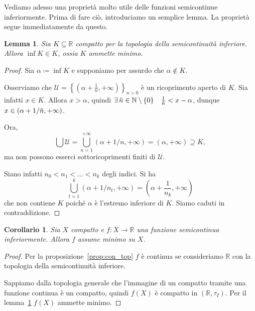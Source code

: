 \documentclass[a4paper, 11pt]{article}
\newcommand{\R}{\mathbb{R}}
\theoremstyle{plain} 	%
\newtheorem{lemma}{Lemma}
\newtheorem{corollario}{Corollario}
\theoremstyle{definition}
\theoremstyle{remark}
\begin{document}
    Vediamo adesso una proprietà molto utile delle funzioni semicontinue inferiormente. Prima di fare ciò, introduciamo un semplice lemma. La proprietà segue immediatamente da questo.
    \begin{lemma}\label{lemma:cpt_inf}
        Sia $K\subseteq\R$ compatto per la topologia della semicontinuità inferiore. Allora $\inf K\in K$, ossia $K$ ammette minimo.        
    \end{lemma}
    \begin{proof}
        Sia $\alpha\coloneqq\inf K$ e supponiamo per assurdo che $\alpha\notin K$. 

        Osserviamo che $\mathcal{U}=\left\{\left(\alpha+\frac{1}{n},+\infty\right)\right\}_{n>0}$ è un ricoprimento aperto di $K$. Sia infatti $x\in K$. Allora $x>\alpha$, quindi $\exists\,\Tilde{n}\in\mathbb{N}\setminus\{0\}\quad \frac{1}{\Tilde{n}}<x-\alpha$, dunque $x\in\left(\alpha+1/\Tilde{n},+\infty\right)$.

        Ora, 
        \[
            \bigcup\mathcal{U}=\bigcup_{n=1}^{+\infty}(\alpha+1/n,+\infty)=\left(\alpha,+\infty\right)\supseteq K,
        \]
        ma non possono esserci sottoricoprimenti finiti di $\mathcal{U}$.

        Siano infatti $n_0<n_1<\dots<n_k$ degli indici. Si ha 
        \[
            \bigcup_{t=1}^k(\alpha+1/n_t,+\infty)=\left(\alpha+\frac{1}{n_k},+\infty\right)
        \]
        che non contiene $K$ poiché $\alpha$ è l'estremo inferiore di $K$. Siamo caduti in contraddizione.
    \end{proof}
    \begin{corollario}
        Sia $X$ compatto e $f\colon X\to\R$ una funzione semicontinua inferiormente. Allora $f$ assume minimo su $X$.
    \end{corollario}
    \begin{proof}
        Per la proposizione~\ref{prop:con_top} $f$ è continua se consideriamo $\R$ con la topologia della semicontinuità inferiore. 

        Sappiamo dalla topologia generale che l'immagine di un compatto tramite una funzione continua è un compatto, quindi $f(X)$ è compatto in $\left(\R,\tau_I\right)$. Per il lemma~\ref{lemma:cpt_inf} $f(X)$ ammette minimo.
    \end{proof}
    
    

    
\end{document}

